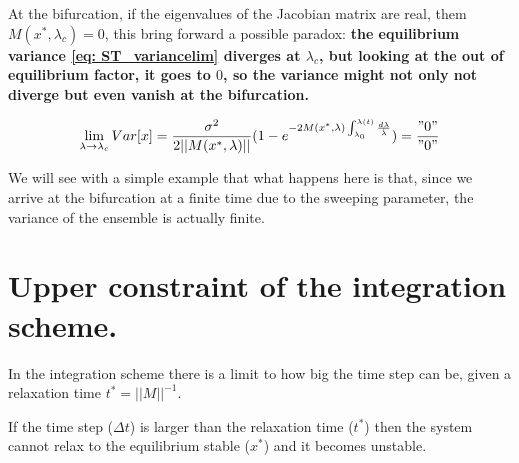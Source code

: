 At the bifurcation, if the eigenvalues of the Jacobian matrix are real, them $M(x^*,\lambda_c)=0$, this bring forward a possible paradox: \textbf{the equilibrium variance \eqref{eq: ST_variancelim} diverges at $\lambda_c$, but looking at the out of equilibrium factor, it goes to $0$, so the variance might not only not diverge but even vanish at the bifurcation.  }


\begin{equation}
	\lim_{\lambda\to\lambda_c} Var[x]=\frac{\sigma^2}{2 ||M(x^*,\lambda)||}(1-e^{-2M(x^*,\lambda)	\int_{\lambda_0}^{\lambda(t)} \frac{d\lambda}{\dot \lambda}})=\frac{"0"}{"0"}
	\label{eq: ST_lamblim}
\end{equation}

We will see with a simple example that what happens here is that, since we arrive at the bifurcation at a finite time due to the sweeping parameter, the variance of the ensemble is actually finite. 


	\section{Upper constraint of the integration scheme.}
	\label{apx:param_speed_integration}
	
	In the integration scheme there is a limit to how big the time step can be, given a relaxation time $t^*=||M||^{-1}$.
	
	If the time step ($\Delta t$) is larger than the relaxation time ($t^*$) then the system cannot relax to the equilibrium stable ($x^*$) and it becomes unstable.
	
